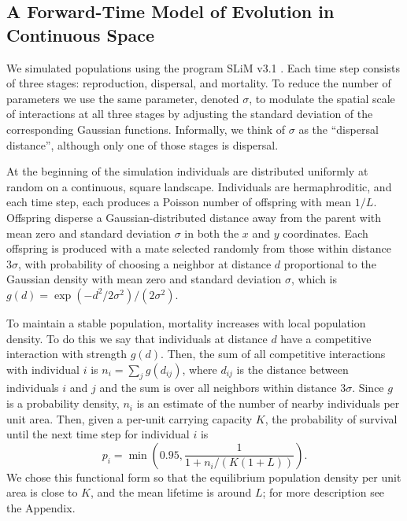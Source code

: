 \documentclass[10pt,twoside,lineno,hidelinks]{preprint}
\begin{document}
\subsection{A Forward-Time Model of Evolution in Continuous Space}

We simulated populations using the program SLiM v3.1 \citep{Haller2019}. 
Each time step consists of three stages: reproduction, dispersal, and mortality. 
To reduce the number of parameters we use the same parameter, denoted $\sigma$, 
to modulate the spatial scale of interactions at all three stages by adjusting the standard deviation of the corresponding Gaussian functions. 
Informally, we think of $\sigma$ as the ``dispersal distance'',
although only one of those stages is dispersal.

At the beginning of the simulation individuals are distributed uniformly at random on a continuous, square landscape. 
Individuals are hermaphroditic, and each time step, each produces a Poisson number of offspring with mean $1/L$.
Offspring disperse a Gaussian-distributed distance away from the parent with mean zero and standard deviation $\sigma$
in both the $x$ and $y$ coordinates. 
Each offspring is produced with a mate selected randomly from those within distance $3 \sigma$,
with probability of choosing a neighbor at distance $d$ proportional to the Gaussian density
with mean zero and standard deviation $\sigma$, which is $g(d) = \exp(-d^2 / 2 \sigma^2)/ (2 \sigma^2)$.

To maintain a stable population, mortality increases with local population density.
To do this we say that individuals at distance $d$ have a competitive interaction with strength $g(d)$.
Then, the sum of all competitive interactions with individual $i$ is $n_i = \sum_j g(d_{ij})$,
where $d_{ij}$ is the distance between individuals $i$ and $j$ and the sum is over all neighbors within distance $3 \sigma$.
Since $g$ is a probability density, $n_i$ is an estimate of the number of nearby individuals per unit area.
Then, given a per-unit carrying capacity $K$, 
the probability of survival until the next time step for individual $i$ is
\begin{equation} \label{eqn:p_survival}
    p_i 
    =
    \min\left( 0.95, \frac{1}{1 + n_i / (K (1+L))} \right) .
\end{equation}
We chose this functional form so that the equilibrium population density per unit area is close to $K$, 
and the mean lifetime is around $L$;
for more description see the Appendix. %
\end{document}
